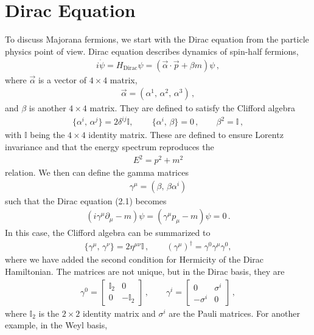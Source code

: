 \documentclass[11pt, oneside]{book}
\theoremstyle{break}
\theoremstyle{break}
\newcommand{\pd}{\partial}
\newcommand{\bmat}[1]{\begin{bmatrix} #1 \end{bmatrix}}
\begin{document}
\section{Dirac Equation}
To discuss Majorana fermions, we start with the Dirac equation from the particle physics point of view. Dirac equation describes dynamics of spin-half fermions,
\begin{align}
i\dot{\psi} = H_{\text{Dirac}}\psi = \left(\vec{\alpha}\cdot \vec{p}+ \beta m \right)\psi\,,
\end{align}
where $\vec{\alpha}$ is a vector of $4\times 4$ matrix, 
\begin{align}
\vec{\alpha} = (\alpha^1, \, \alpha^2,\,\alpha^3)\,,
\end{align}
and $\beta$ is another $4\times 4$ matrix. They are defined to satisfy the Clifford algebra
\begin{align}
\{\alpha^i,\, \alpha^j\} = 2\delta^{ij}\mathbb{I},\,\qquad
\{\alpha^i,\, \beta\} = 0\,,\qquad
\beta^2 = \mathbb{I}\,,
\end{align}
with $\mathbb{I}$ being the $4\times 4$ identity matrix. These are defined to ensure Lorentz invariance and that the energy spectrum reproduces the 
\begin{align}
E^2 = p^2 + m^2
\end{align}
relation. We then can define the gamma matrices
\begin{align}
\gamma^\mu = \left(\beta,\, \beta \alpha^i\right)
\end{align}
such that the Dirac equation (2.1) becomes
\begin{align}
(i\gamma^\mu \pd_\mu - m) \psi = (\gamma^\mu p_\mu -m) \psi 
= 0\,.
\end{align}
In this case, the Clifford algebra can be summarized to
\begin{align}
\{ \gamma^\mu, \, \gamma^\nu\} = 2\eta^{\mu\nu}\mathbb{I}\,,\qquad
(\gamma^\mu)^\dagger  = \gamma^0 \gamma^\mu \gamma^0
,
\end{align}
where we have added the second condition for Hermicity of the Dirac Hamiltonian. 
The matrices are not unique, but in the Dirac basis, they are 
\begin{align}
\gamma^0 = \bmat{\mathbb{I}_2 & 0 \\ 0 & -\mathbb{I}_2}\,,\qquad
\gamma^i = \bmat{0 & \sigma^i \\ -\sigma^i & 0}\,,
\end{align}
where $\mathbb{I}_2$ is the $2\times 2$ identity matrix and $\sigma^i$ are the Pauli matrices. For another example, in the Weyl basis,
\end{document}
